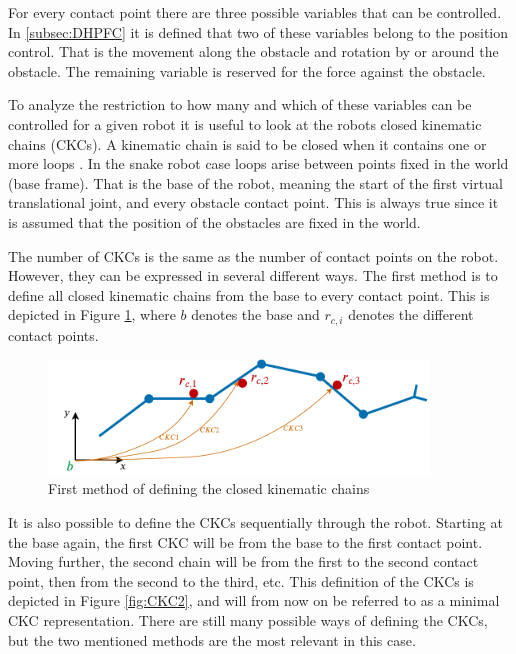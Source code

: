 For every contact point there are three possible variables that can be controlled. In \ref{subsec:DHPFC} it is defined that two of these variables belong to the position control. That is the movement along the obstacle and rotation by or around the obstacle. The remaining variable is reserved for the force against the obstacle.

To analyze the restriction to how many and which of these variables can be controlled for a given robot it is useful to look at the robots closed kinematic chains (CKCs). A kinematic chain is said to be closed when it contains one or more loops \cite{lynch2017modern}. In the snake robot case loops arise between points fixed in the world (base frame). That is the base of the robot, meaning the start of the first virtual translational joint, and every obstacle contact point. This is always true since it is assumed that the position of the obstacles are fixed in the world.

The number of CKCs is the same as the number of contact points on the robot. However, they can be expressed in several different ways. The first method is to define all closed kinematic chains from the base to every contact point. This is depicted in Figure \ref{fig:CKC1}, where $b$ denotes the base and $r_{c,i}$ denotes the different contact points.

\begin{figure}
    \centering
    \includegraphics[width=0.9\textwidth]{figures/theory/CKC1.pdf}
    \caption{First method of defining the closed kinematic chains}
    \label{fig:CKC1}
\end{figure}

It is also possible to define the CKCs sequentially through the robot. Starting at the base again, the first CKC will be from the base to the first contact point. Moving further, the second chain will be from the first to the second contact point, then from the second to the third, etc. This definition of the CKCs is depicted in Figure \ref{fig:CKC2}, and will from now on be referred to as a minimal CKC representation. There are still many possible ways of defining the CKCs, but the two mentioned methods are the most relevant in this case.


